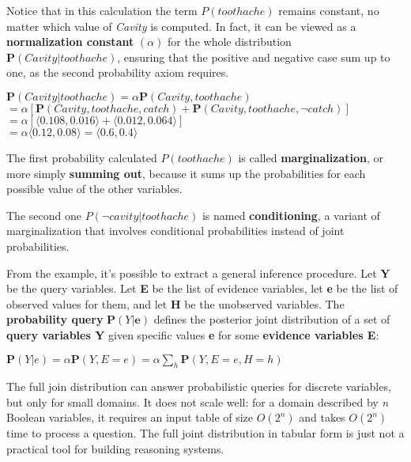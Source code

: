 \begin{example}
    Notice that in this calculation the term $P(toothache)$ remains constant, no matter which value of \textit{Cavity} is computed. In fact, it can be viewed as a \textbf{normalization constant} $(\alpha)$ for the whole distribution $\mathbf{P}(Cavity|toothache)$, ensuring that the positive and negative case sum up to one, as the second probability axiom requires. \vspace*{7pt}

    $\mathbf{P}(Cavity|toothache) = \alpha\mathbf{P}(Cavity, toothache)$ \\
    $= \alpha[\mathbf{P}(Cavity, toothache, catch) + \mathbf{P}(Cavity, toothache, \neg catch)]$ \\
    $= \alpha[\langle0.108, 0.016\rangle + \langle0.012, 0.064\rangle]$ \\
    $= \alpha\langle0.12, 0.08\rangle = \langle0.6, 0.4\rangle$
\end{example}
\begin{definition}
    The first probability calculated $P(toothache)$ is called \textbf{marginalization}, or more simply \textbf{summing out}, because it sums up the probabilities for each possible value of the other variables.
\end{definition}
\begin{definition}
    The second one $P(\neg cavity|toothache)$ is named \textbf{conditioning}, a variant of marginalization that involves conditional probabilities instead of joint probabilities.
\end{definition}
\begin{definition}
    From the example, it's possible to extract a general inference procedure. Let \textbf{Y} be the query variables. Let \textbf{E} be the list of evidence variables, let \textbf{e} be the list of observed values for them, and let \textbf{H} be the unobserved variables. The \textbf{probability query} $\mathbf{P}(Y|\mathbf{e})$ defines the posterior joint distribution of a set of \textbf{query variables Y} given specific values \textbf{e} for some \textbf{evidence variables E}: \vspace{3.5pt}
    \begin{center}
        $\mathbf{P}(Y|e) = \alpha\mathbf{P}(Y, E=e) = \alpha\sum_{h}\mathbf{P}(Y, E=e, H=h)$
    \end{center}
\end{definition}
The full join distribution can answer probabilistic queries for discrete variables, but only for small domains. It does not scale well: for a domain described by \textit{n} Boolean variables, it requires an input table of size \textit{$O(2^n)$} and takes \textit{$O(2^n)$} time to process a question. The full joint distribution in tabular form is just not a practical tool for building reasoning systems.